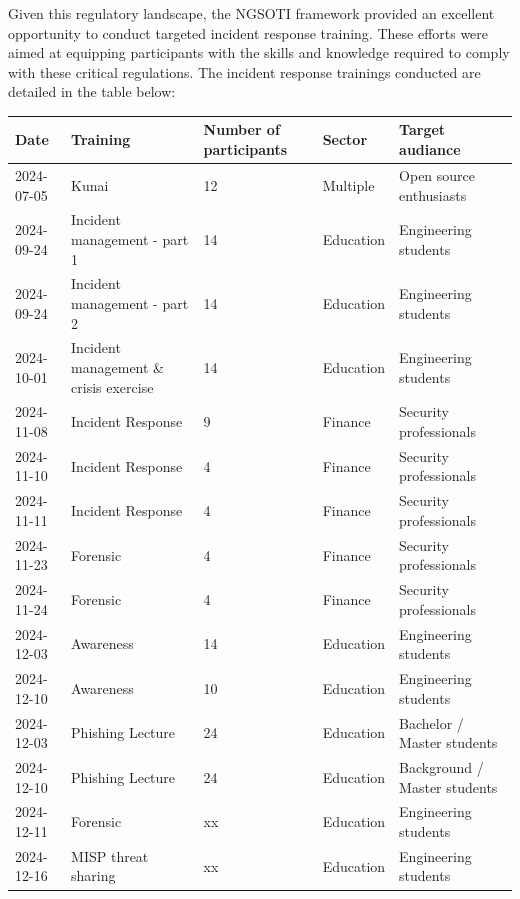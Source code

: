 Given this regulatory landscape, the NGSOTI framework provided an excellent opportunity to conduct targeted incident response training. These efforts were aimed at equipping participants with the skills and knowledge required to comply with these critical regulations. The incident response trainings conducted are detailed in the table below:


\begin{table}
	\begin{tabular}{lllll}
		\hline
		Date       & Training            & Number of participants & Sector    & Target audiance         \\
		\hline
		2024-07-05 & Kunai               & 12                     & Multiple  & Open source enthusiasts \\
        2024-09-24 & Incident management - part 1  &14            & Education & Engineering students\\
        2024-09-24 & Incident management  - part 2 & 14           & Education & Engineering students \\
        2024-10-01 & Incident management \& crisis  exercise & 14 & Education & Engineering students\\
		2024-11-08 & Incident Response   & 9                      & Finance   & Security professionals  \\
		2024-11-10 & Incident Response   & 4                      & Finance   & Security professionals  \\
		2024-11-11 & Incident Response   & 4                      & Finance   & Security professionals  \\
		2024-11-23 & Forensic            & 4                      & Finance   & Security professionals  \\
		2024-11-24 & Forensic            & 4                      & Finance   & Security professionals  \\
  		2024-12-03 & Awareness		 & 14 			  & Education & Engineering students    \\
    	2024-12-10 & Awareness		 & 10 			  & Education & Engineering students    \\
        2024-12-03 & Phishing Lecture & 24 & Education & Bachelor / Master students\\
        2024-12-10 & Phishing Lecture & 24 & Education & Background / Master students\\
		2024-12-11 & Forensic            & xx                     & Education & Engineering students    \\
		2024-12-16 & MISP threat sharing & xx                     & Education & Engineering students    \\
		\hline
	\end{tabular}
\end{table}

